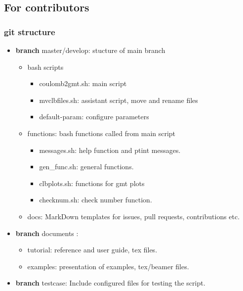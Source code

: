\subsection{For contributors}\label{for-contributors}

\subsubsection{git structure}\label{git-structure}

\begin{itemize}

\item
  \textbf{branch} master/develop: stucture of main branch

  \begin{itemize}
  
  \item
    bash scripts

    \begin{itemize}
    
    \item
      coulomb2gmt.sh: main script
    \item
      mvclbfiles.sh: assistant script, move and rename files
    \item
      default-param: configure parameters
    \end{itemize}
  \item
    functions: bash functions called from main script

    \begin{itemize}
    
    \item
      messages.sh: help function and ptint messages.
    \item
      gen\_func.sh: general functions.
    \item
      clbplots.sh: functions for gmt plots
    \item
      checknum.sh: check number function.
    \end{itemize}
  \item
    docs: MarkDown templates for issues, pull requests, contributions
    etc.
  \end{itemize}
\item
  \textbf{branch} documents :

  \begin{itemize}
  
  \item
    tutorial: reference and user guide, tex files.
  \item
    examples: presentation of examples, tex/beamer files.
  \end{itemize}
\item
  \textbf{branch} testcase: Include configured files for testing the
  script.
\end{itemize}

